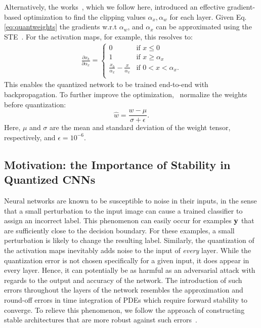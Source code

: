 \documentclass[reqno]{amsart}
\newcommand{\bfy}{ {\bf y}}
\begin{document}
Alternatively, the works~\cite{li2019apot,esser2019learned}, which we follow here, introduced an effective gradient-based optimization to find the clipping values $\alpha_x,\alpha_w$ for each layer. Given Eq. \eqref{eq:quantweights} the gradients w.r.t $\alpha_w$, and $\alpha_x$ can be approximated using the STE~\cite{li2019apot,esser2019learned}. For the activation maps, for example, this resolves to:
\begin{eqnarray}
\label{eq:act_alpha_derivative}
    \frac{\partial{x_b}}{\partial{\alpha_x}} = 
    \begin{cases}
    0 & \text{if $x \leq 0$} \\
    1 & \text{if $x \geq \alpha_x$} \\
    \frac{x_b}{\alpha_x} - \frac{x}{\alpha_x} & \text{if $0 < x < \alpha_x$}. \\
    \end{cases}
\end{eqnarray}
This enables the quantized network to be trained end-to-end with backpropagation.
To further improve the optimization,~\cite{li2019apot} normalize the weights before quantization:
 \begin{equation} \label{eq:normalize}
     \hat w = \frac{w - \mu}{\sigma  + \epsilon}.
\end{equation}
Here, $\mu$ and $\sigma$ are the mean and standard deviation of the weight tensor, respectively, and $\epsilon=10^{-6}$.

\subsection{\textbf{Motivation: the Importance of Stability in Quantized CNNs}}
\label{sub:background_motivation}
Neural networks are known to be susceptible to noise in their inputs, in the sense that a small perturbation to the input image can cause a trained classifier to assign an incorrect label. This phenomenon can easily occur for examples $\bfy$ that are sufficiently close to the decision boundary. For these examples, a small perturbation is likely to change the resulting label. Similarly, the quantization of the activation maps inevitably adds noise to the input of \emph{every} layer. While the quantization error is not chosen specifically for a given input, it does appear in every layer. Hence, it can potentially be as harmful as an adversarial attack with regards to the output and accuracy of the network. The introduction of such errors throughout the layers of the network resembles the approximation and round-off errors in time integration of PDEs which require forward stability to converge. To relieve this phenomenon, we follow the approach of constructing stable architectures that are more robust against such errors~\cite{HaberRuthotto2017}.
\end{document}
